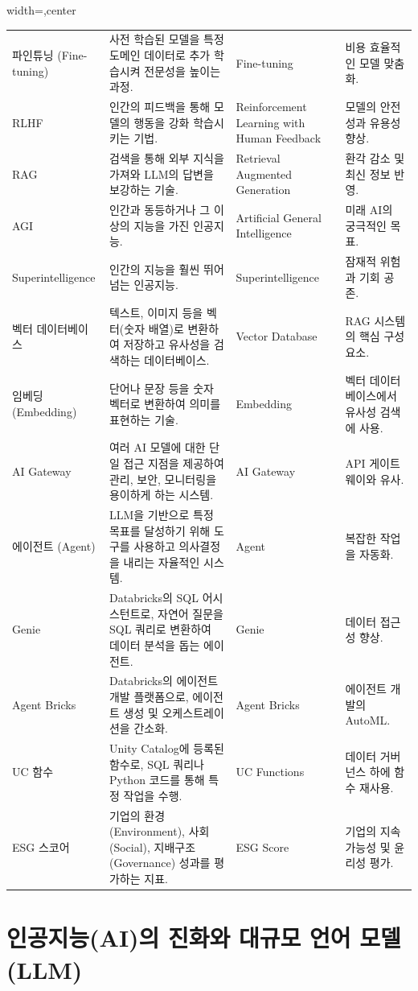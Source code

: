 \documentclass[11pt,a4paper]{article}
\begin{document}
\begin{adjustbox}{width=\textwidth,center}
\begin{tabular}{llll}
파인튜닝 (Fine-tuning) & 사전 학습된 모델을 특정 도메인 데이터로 추가 학습시켜 전문성을 높이는 과정. & Fine-tuning & 비용 효율적인 모델 맞춤화. \\
RLHF & 인간의 피드백을 통해 모델의 행동을 강화 학습시키는 기법. & Reinforcement Learning with Human Feedback & 모델의 안전성과 유용성 향상. \\
RAG & 검색을 통해 외부 지식을 가져와 LLM의 답변을 보강하는 기술. & Retrieval Augmented Generation & 환각 감소 및 최신 정보 반영. \\
AGI & 인간과 동등하거나 그 이상의 지능을 가진 인공지능. & Artificial General Intelligence & 미래 AI의 궁극적인 목표. \\
Superintelligence & 인간의 지능을 훨씬 뛰어넘는 인공지능. & Superintelligence & 잠재적 위험과 기회 공존. \\
벡터 데이터베이스 & 텍스트, 이미지 등을 벡터(숫자 배열)로 변환하여 저장하고 유사성을 검색하는 데이터베이스. & Vector Database & RAG 시스템의 핵심 구성 요소. \\
임베딩 (Embedding) & 단어나 문장 등을 숫자 벡터로 변환하여 의미를 표현하는 기술. & Embedding & 벡터 데이터베이스에서 유사성 검색에 사용. \\
AI Gateway & 여러 AI 모델에 대한 단일 접근 지점을 제공하여 관리, 보안, 모니터링을 용이하게 하는 시스템. & AI Gateway & API 게이트웨이와 유사. \\
에이전트 (Agent) & LLM을 기반으로 특정 목표를 달성하기 위해 도구를 사용하고 의사결정을 내리는 자율적인 시스템. & Agent & 복잡한 작업을 자동화. \\
Genie & Databricks의 SQL 어시스턴트로, 자연어 질문을 SQL 쿼리로 변환하여 데이터 분석을 돕는 에이전트. & Genie & 데이터 접근성 향상. \\
Agent Bricks & Databricks의 에이전트 개발 플랫폼으로, 에이전트 생성 및 오케스트레이션을 간소화. & Agent Bricks & 에이전트 개발의 AutoML. \\
UC 함수 & Unity Catalog에 등록된 함수로, SQL 쿼리나 Python 코드를 통해 특정 작업을 수행. & UC Functions & 데이터 거버넌스 하에 함수 재사용. \\
ESG 스코어 & 기업의 환경(Environment), 사회(Social), 지배구조(Governance) 성과를 평가하는 지표. & ESG Score & 기업의 지속 가능성 및 윤리성 평가. \\
\bottomrule
\end{tabular}
\end{adjustbox}

\newpage
\section{인공지능(AI)의 진화와 대규모 언어 모델(LLM)}
\end{document}
